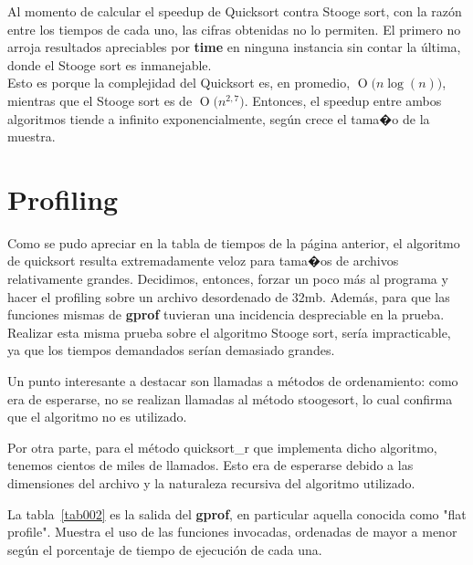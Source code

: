 \documentclass[a4paper,10pt]{article}
\newcommand{\BigO}[1]{\ensuremath{\operatorname{O}\bigl(#1\bigr)}}
\begin{document}
Al momento de calcular el speedup de Quicksort contra Stooge sort, con la raz\'on entre los tiempos de cada uno, las cifras obtenidas no lo permiten. El primero no arroja resultados apreciables por \textbf{time} en ninguna instancia sin contar la \'ultima, donde el Stooge sort es inmanejable.\\

Esto es porque la complejidad del Quicksort es, en promedio, \BigO{n \log(n)}, mientras que el Stooge sort es de \BigO{n^{2,7}}. Entonces, el speedup entre ambos algoritmos tiende a infinito exponencialmente, seg\'un crece el tama�o de la muestra.


\section{Profiling}

Como se pudo apreciar en la tabla de tiempos de la p\'agina anterior, el algoritmo de quicksort resulta extremadamente veloz para tama�os de archivos relativamente grandes. Decidimos, entonces, forzar un poco m\'as al programa y hacer el profiling sobre un archivo desordenado de 32mb. Adem\'as, para que las funciones mismas de \textbf{gprof} tuvieran una incidencia despreciable en la prueba.\\
Realizar esta misma prueba sobre el algoritmo Stooge sort, ser\'ia impracticable, ya que los tiempos demandados ser\'ian demasiado grandes.

Un punto interesante a destacar son llamadas a m\'etodos de ordenamiento: como era de esperarse, no se realizan llamadas al m\'etodo stoogesort, lo cual confirma que el algoritmo no es utilizado.
										
										   Por otra parte, para el m\'etodo quicksort\_r que implementa dicho algoritmo, tenemos cientos de miles de llamados. Esto era de esperarse debido a las dimensiones del archivo y la naturaleza recursiva del algoritmo utilizado.

La tabla~\ref{tab002} es la salida del \textbf{gprof}, en particular aquella conocida como "flat profile". Muestra el uso de las funciones invocadas, ordenadas de mayor a menor seg\'un el porcentaje de tiempo de ejecuci\'on de cada una.
\end{document}
